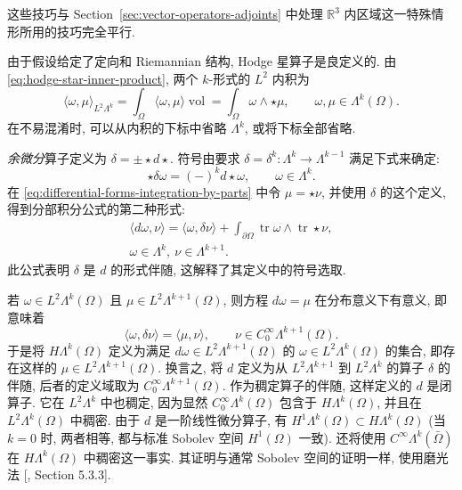 {这些技巧与 Section~\ref{sec:vector-operators-adjoints} 中处理 $\mathbb R^3$ 内区域这一特殊情形所用的技巧完全平行.}

{由于假设给定了定向和 Riemannian 结构, Hodge 星算子是良定义的. 由 \eqref{eq:hodge-star-inner-product}, 两个 $k$-形式的 $L^2$ 内积为}
\[
\langle\omega,\mu\rangle_{L^2\Lambda^k}=\int_\Omega\langle\omega,\mu\rangle\operatorname{vol}=\int_\Omega\omega\wedge\star\mu,\qquad\omega,\mu\in\Lambda^k(\Omega).
\]
{在不易混淆时, 可以从内积的下标中省略 $\Lambda^k$, 或将下标全部省略.}

{\emph{余微分}算子定义为 $\delta=\pm\star d\star$. 符号由要求 $\delta=\delta^k:\Lambda^k\to\Lambda^{k-1}$ 满足下式来确定:}
\[
\star\delta\omega=(-)^kd\star\omega,\qquad\omega\in\Lambda^k.
\]
{在 \eqref{eq:differential-forms-integration-by-parts} 中令 $\mu=\star\nu$, 并使用 $\delta$ 的这个定义, 得到分部积分公式的第二种形式:}
\[
\begin{gathered}
\langle d\omega,\nu\rangle=\langle\omega,\delta\nu\rangle+\int_{\partial\Omega}\operatorname{tr}\omega\wedge\operatorname{tr}\star\nu,\\
\omega\in\Lambda^k,\ \nu\in\Lambda^{k+1}.
\end{gathered}
\]
{此公式表明 $\delta$ 是 $d$ 的形式伴随, 这解释了其定义中的符号选取.}

{若 $\omega\in L^2\Lambda^k(\Omega)$ 且 $\mu\in L^2\Lambda^{k+1}(\Omega)$, 则方程 $d\omega=\mu$ 在分布意义下有意义, 即意味着}
\[
\langle\omega,\delta\nu\rangle=\langle\mu,\nu\rangle,\qquad\nu\in C_0^\infty\Lambda^{k+1}(\Omega).
\]
{于是将 $H\Lambda^k(\Omega)$ 定义为满足 $d\omega\in L^2\Lambda^{k+1}(\Omega)$ 的 $\omega\in L^2\Lambda^k(\Omega)$ 的集合, 即存在这样的 $\mu\in L^2\Lambda^{k+1}(\Omega)$. 换言之, 将 $d$ 定义为从 $L^2\Lambda^{k+1}$ 到 $L^2\Lambda^k$ 的算子 $\delta$ 的伴随, 后者的定义域取为 $C_0^\infty\Lambda^{k+1}(\Omega)$. 作为稠定算子的伴随, 这样定义的 $d$ 是闭算子. 它在 $L^2\Lambda^k$ 中也稠定, 因为显然 $C_0^\infty\Lambda^k(\Omega)$ 包含于 $H\Lambda^k(\Omega)$, 并且在 $L^2\Lambda^k(\Omega)$ 中稠密. 由于 $d$ 是一阶线性微分算子, 有 $H^1\Lambda^k(\Omega)\subset H\Lambda^k(\Omega)$ (当 $k=0$ 时, 两者相等, 都与标准 Sobolev 空间 $H^1(\Omega)$ 一致). 还将使用 $C^\infty\Lambda^k(\bar\Omega)$ 在 $H\Lambda^k(\Omega)$ 中稠密这一事实. 其证明与通常 Sobolev 空间的证明一样, 使用磨光法 [, Section 5.3.3].}

